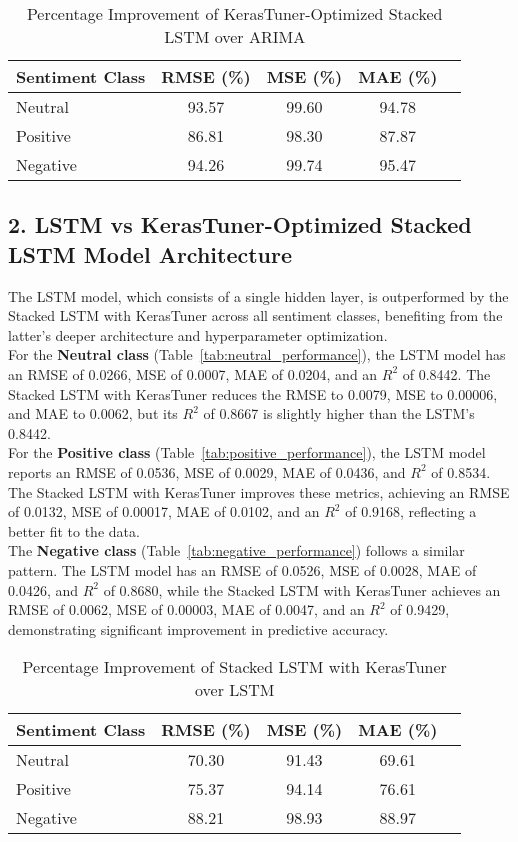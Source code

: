 \documentclass[letterpaper]{article}
\begin{document}
\begin{table}[h]
\centering
\caption{Percentage Improvement of KerasTuner-Optimized Stacked LSTM over ARIMA}
\label{tab:improvement_metrics}
\begin{tabular}{lcccc}
\toprule
\textbf{Sentiment Class} & \textbf{RMSE (\%)} & \textbf{MSE (\%)} & \textbf{MAE (\%)} \\
\midrule
Neutral & 93.57 & 99.60 & 94.78  \\
Positive & 86.81 & 98.30 & 87.87 \\
Negative & 94.26 & 99.74 & 95.47 \\
\bottomrule
\end{tabular}
\end{table}

\subsection{2. LSTM vs KerasTuner-Optimized Stacked LSTM Model Architecture}
The LSTM model, which consists of a single hidden layer, is outperformed by the Stacked LSTM with KerasTuner across all sentiment classes, benefiting from the latter's deeper architecture and hyperparameter optimization.\\

For the \textbf{Neutral class} (Table~\ref{tab:neutral_performance}), the LSTM model has an RMSE of 0.0266, MSE of 0.0007, MAE of 0.0204, and an $R^2$ of 0.8442. The Stacked LSTM with KerasTuner reduces the RMSE to 0.0079, MSE to 0.00006, and MAE to 0.0062, but its $R^2$ of 0.8667 is slightly higher than the LSTM's 0.8442.\\

For the \textbf{Positive class} (Table~\ref{tab:positive_performance}), the LSTM model reports an RMSE of 0.0536, MSE of 0.0029, MAE of 0.0436, and $R^2$ of 0.8534. The Stacked LSTM with KerasTuner improves these metrics, achieving an RMSE of 0.0132, MSE of 0.00017, MAE of 0.0102, and an $R^2$ of 0.9168, reflecting a better fit to the data.\\

The \textbf{Negative class} (Table~\ref{tab:negative_performance}) follows a similar pattern. The LSTM model has an RMSE of 0.0526, MSE of 0.0028, MAE of 0.0426, and $R^2$ of 0.8680, while the Stacked LSTM with KerasTuner achieves an RMSE of 0.0062, MSE of 0.00003, MAE of 0.0047, and an $R^2$ of 0.9429, demonstrating significant improvement in predictive accuracy.

\begin{table}[h]
\centering
\caption{Percentage Improvement of Stacked LSTM with KerasTuner over LSTM}
\label{tab:improvement_metrics_lstm}
\begin{tabular}{lcccc}
\toprule
\textbf{Sentiment Class} & \textbf{RMSE (\%)} & \textbf{MSE (\%)} & \textbf{MAE (\%)} \\
\midrule
Neutral & 70.30 & 91.43 & 69.61  \\
Positive & 75.37 & 94.14 & 76.61 \\
Negative & 88.21 & 98.93 & 88.97 \\
\bottomrule
\end{tabular}
\end{table}
\end{document}
